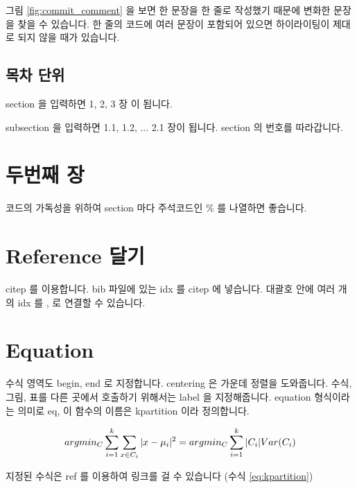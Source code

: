\documentclass[11pt]{article}
\begin{document}
그림 \ref{fig:commit_comment} 을 보면 한 문장을 한 줄로 작성했기 때문에 변화한 문장을 찾을 수 있습니다.
한 줄의 코드에 여러 문장이 포함되어 있으면 하이라이팅이 제대로 되지 않을 때가 있습니다.

\subsection{목차 단위}

section 을 입력하면 1, 2, 3 장 이 됩니다.

subsection 을 입력하면 1.1, 1.2, ... 2.1 장이 됩니다. section 의 번호를 따라갑니다.

\section{두번째 장}

코드의 가독성을 위하여 section 마다 주석코드인 \% 를 나열하면 좋습니다.

\section{Reference 달기}

citep 를 이용합니다. bib 파일에 있는 idx 를 citep 에 넣습니다. \citep{jain2010data} 대괄호 안에 여러 개의 idx 를 , 로 연결할 수 있습니다.

\section{Equation}

수식 영역도 begin, end 로 지정합니다.
centering 은 가운데 정렬을 도와줍니다.
수식, 그림, 표를 다른 곳에서 호출하기 위해서는 label 을 지정해줍니다.
equation 형식이라는 의미로 eq, 이 함수의 이름은 kpartition 이라 정의합니다.

\begin{equation}
\label{eq:kpartition}
\centering
arg min_C\sum_{i=1}^{k} \sum_{x \in C_i} \vert x - \mu_i \vert^2 = arg min_C \sum_{i=1}^{k} \vert C_i \vert Var(C_i)
\end{equation}

지정된 수식은 ref 를 이용하여 링크를 걸 수 있습니다 (수식 \ref{eq:kpartition})

\end{document}
